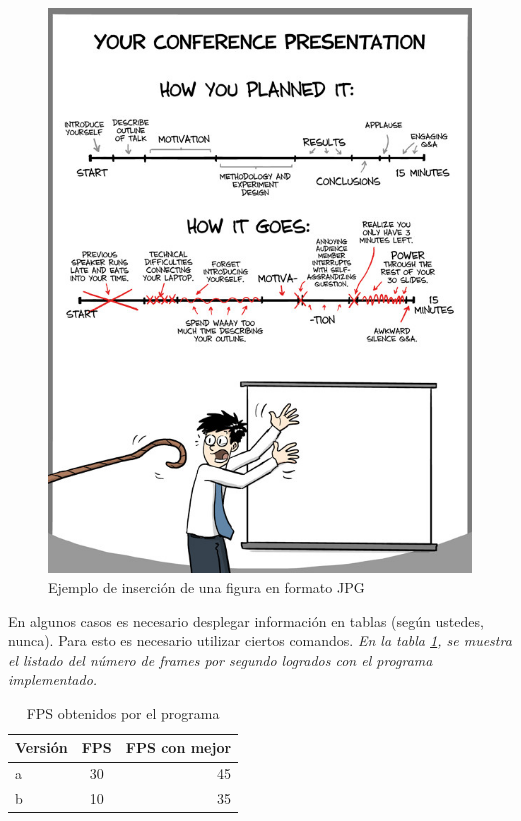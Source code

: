 \documentclass[conference]{IEEEtran}
\begin{document}
%
%
% 
\begin{figure}
\includegraphics*[width=\breite \columnwidth]{113114164} 
\caption{Ejemplo de inserción de una figura en formato JPG }
\label{fig:JPG}
\end{figure}

En algunos casos es necesario desplegar información en tablas (según ustedes, nunca). Para esto es necesario utilizar ciertos comandos. \textit{En la tabla \ref{tabla1}, se muestra el listado del número de frames por segundo logrados con el programa implementado.} 

\begin{table}
  \centering
  \caption{FPS obtenidos por el programa}
  \label{tab:table1}
  \begin{tabular}{l|c||r}
    Versión & FPS & FPS con mejor\\
    \hline
    a & 30 & 45\\
    b & 10 & 35\\
  \end{tabular}
  \label{tabla1}
\end{table}
\end{document}
